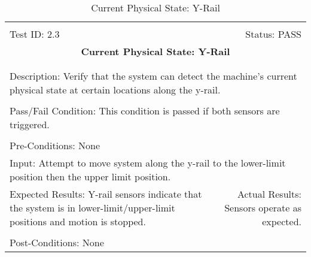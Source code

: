 \documentclass[titlepage]{article}
\begin{document}
\begin{center}
\begin{table}[h!]
\begin{tabular}{|l r|}\hline&\\[-2mm]
	Test ID: 2.3	&Status: PASS\\[-3mm]
	\multicolumn{2}{|c|}{\textbf{\large{Current Physical State: Y-Rail}}}\\&\\\hline&\\[-3mm]
	\multicolumn{2}{|p{\textwidth}|}{Description: Verify that the system can detect the machine's current physical state at certain locations along the y-rail.}\\[1mm]\hline&\\[-3mm]
	\multicolumn{2}{|p{\textwidth}|}{Pass/Fail Condition: This condition is passed if both sensors are triggered.}\\[1mm]\hline&\\[-3mm]
	\multicolumn{2}{|p{\textwidth}|}{Pre-Conditions: None}\\[4mm]
	\multicolumn{2}{|p{\textwidth}|}{Input: Attempt to move system along the y-rail to the lower-limit position then the upper limit position.}\\[2mm]\hline
	\multicolumn{1}{|p{0.49\textwidth}}{Expected Results: Y-rail sensors indicate that the system is in lower-limit/upper-limit positions and motion is stopped.}	&\multicolumn{1}{|p{0.45\textwidth}|}{Actual Results: Sensors operate as expected.}\\\hline&\\[-3mm]
	\multicolumn{2}{|p{\textwidth}|}{Post-Conditions: None}\\\hline
\end{tabular}
\caption{Current Physical State: Y-Rail}
\end{table}
\end{center}
\newpage
\end{document}

